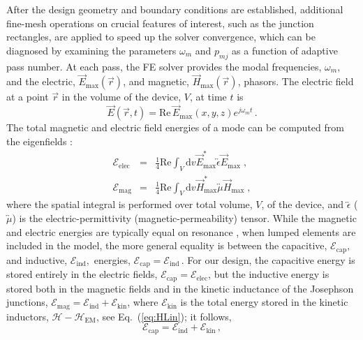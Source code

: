 After the design geometry and boundary conditions are established,
 additional fine-mesh operations on crucial features of interest,
such as the junction rectangles, are applied to speed up the solver
convergence, which can be diagnosed by examining the parameters $\omega_{m}$
and $p_{mj}$ as a function of adaptive pass number. At each pass,
the FE solver provides the modal frequencies, $\omega_{m},$ and the
electric, $\vec{E}_{\mathrm{max}}(\vec{r})$, and magnetic, $\vec{H}_{\mathrm{max}}(\vec{r})$,
phasors. The electric field at a point $\vec{r}$ in the volume of
the device, $V$, at time $t$ is 
\[
\vec{E}\left(\vec{r},t\right)=\mathrm{Re}\,\vec{E}_{\mathrm{max}}\left(x,y,z\right)e^{j\omega_{m}t}\,.
\]
The total magnetic and electric field energies of a mode can be computed
from the eigenfields \citep{Pozar}:
\begin{eqnarray}
\mathcal{E}_{\mathrm{elec}} & = & \frac{1}{4}\mathrm{Re}\int_{V}\mathrm{d}v\vec{E}_{\text{max}}^{*}\overleftrightarrow{\epsilon}\vec{E}_{\text{max}}\;,\label{eq:app:FE:  W_E  W_H  integrals}\\
\mathcal{E}_{\mathrm{mag}} & = & \frac{1}{4}\mathrm{Re}\int_{V}\mathrm{d}v\vec{H}_{\text{max}}^{*}\overleftrightarrow{\mu}\vec{H}_{\text{max}}\;,\label{eq:app:FE:  W_H  integral}
\end{eqnarray}
where the spatial integral is performed over total volume, $V$, of
the device, and $\overleftrightarrow{\epsilon}$ ($\overleftrightarrow{\mu}$)
is the electric-permittivity (magnetic-permeability) tensor. While
the magnetic and electric energies are typically equal on resonance
\citep{Pozar}, when lumped elements are included in the model, the
more general equality is between the capacitive, $\mathcal{E}_{\mathrm{cap}},$
and inductive, $\mathcal{E}_{\mathrm{ind}},$ energies, $\mathcal{E}_{\mathrm{cap}}=\mathcal{E}_{\mathrm{ind}}\,.$
For our design, the capacitive energy is stored entirely in the electric
fields, $\mathcal{E}_{\mathrm{cap}}=\mathcal{E}_{\mathrm{elec}}$,
but the inductive energy is stored both in the magnetic fields and
in the kinetic inductance of the Josephson junctions, $\mathcal{E}_{\mathrm{mag}}=\mathcal{E}_{\mathrm{ind}}+\mathcal{E}_{\mathrm{kin}}$,
where $\mathcal{E}_{\mathrm{kin}}$ is the total energy stored in
the kinetic inductors, $\mathcal{H}-\mathcal{H}_{\mathrm{EM}}$, see
Eq.~(\ref{eq:HLin}); it follows, 
\begin{equation}
\mathcal{E}_{\mathrm{cap}}=\mathcal{E}_{\mathrm{ind}}+\mathcal{E}_{\mathrm{kin}}\,,\label{eq:CapIndKinEnegry}
\end{equation}
